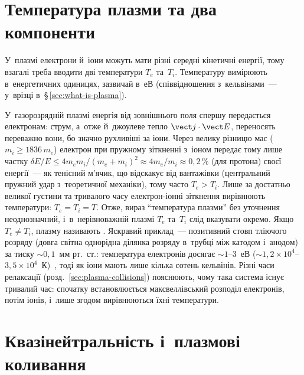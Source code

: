 \section{Температура плазми та два компоненти}\label{sec:two-temperatures}


У~плазмі електрони й~іони можуть мати різні середні кінетичні енергії, тому взагалі треба
вводити дві температури $T_e$ та~$T_i$. Температуру вимірюють в~енергетичних одиницях, зазвичай в~еВ (співвідношення з~кельвінами~--- у~врізці в~§\,\ref{sec:what-is-plasma}).

У~газорозрядній плазмі енергія від зовнішнього поля спершу передається електронам: струм, а~отже й~джоулеве тепло $\vect j\cdot\vect E$, переносять переважно вони, бо значно рухливіші за іони. Через
велику різницю мас ($m_i\geq1836\,m_e$) електрон при пружному зіткненні з~іоном передає
тому лише частку $\delta E/E\le4m_em_i/(m_e+m_i)^2\approx4m_e/m_i\approx0{,}2\,\%$ (для протона) своєї енергії~--- як тенісний м'ячик, що відскакує від вантажівки
(центральний пружний удар з~теоретичної механіки), тому часто $T_e>T_i$. Лише за достатньо
великої густини та тривалого часу електрон-іонні зіткнення вирівнюють температури:
$T_e=T_i=T$. Отже, вираз \enquote{температура плазми} без уточнення неоднозначний,
і~в~нерівноважній плазмі $T_e$ та~$T_i$ слід вказувати окремо. Якщо $T_e\neq T_i$, плазму
називають . Яскравий приклад~--- позитивний стовп
тліючого розряду (довга світна однорідна ділянка розряду в~трубці між катодом і~анодом)
за тиску $\sim0{,}1$~мм рт.~ст.: температура електронів досягає
$\sim1$--$3$~еВ ($\sim1{,}2\times10^4$--$3{,}5\times10^4$~К)~\cite{chen2016introduction}, тоді як іони мають лише кілька сотень кельвінів.
Різні часи релаксації (розд.~\ref{sec:plasma-collisions}) пояснюють, чому така система існує
тривалий час: спочатку встановлюється максвеллівський розподіл електронів, потім іонів,
і~лише згодом вирівнюються їхні температури.


\section{Квазінейтральність і~плазмові коливання}\label{sec:quasineutrality}


